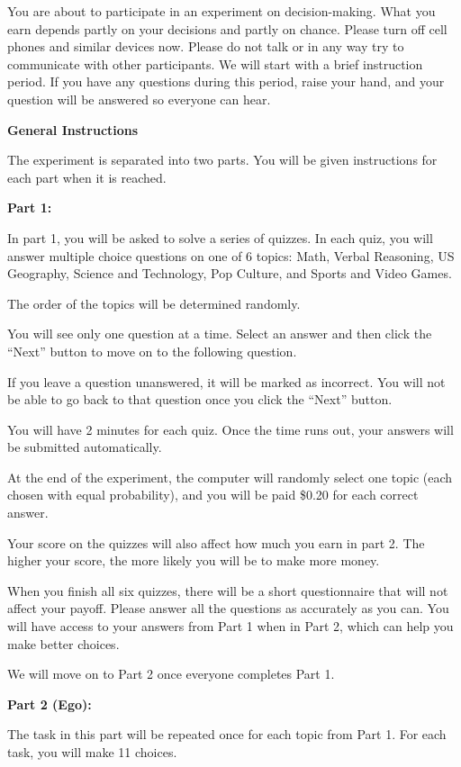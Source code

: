 \documentclass[
  12pt,
]{article}
\begin{document}
You are about to participate in an experiment on decision-making. What
you earn depends partly on your decisions and partly on chance. Please
turn off cell phones and similar devices now. Please do not talk or in
any way try to communicate with other participants. We will start with a
brief instruction period. If you have any questions during this period,
raise your hand, and your question will be answered so everyone can
hear.

\textbf{General Instructions}

The experiment is separated into two parts. You will be given
instructions for each part when it is reached.

\textbf{Part 1:}

In part 1, you will be asked to solve a series of quizzes. In each quiz,
you will answer multiple choice questions on one of 6 topics: Math,
Verbal Reasoning, US Geography, Science and Technology, Pop Culture, and
Sports and Video Games.

The order of the topics will be determined randomly.

You will see only one question at a time. Select an answer and then
click the ``Next'' button to move on to the following question.

If you leave a question unanswered, it will be marked as incorrect. You
will not be able to go back to that question once you click the ``Next''
button.

You will have 2 minutes for each quiz. Once the time runs out, your
answers will be submitted automatically.

At the end of the experiment, the computer will randomly select one
topic (each chosen with equal probability), and you will be paid \$0.20
for each correct answer.

Your score on the quizzes will also affect how much you earn in part 2.
The higher your score, the more likely you will be to make more money.

When you finish all six quizzes, there will be a short questionnaire
that will not affect your payoff. Please answer all the questions as
accurately as you can. You will have access to your answers from Part 1
when in Part 2, which can help you make better choices.

We will move on to Part 2 once everyone completes Part 1.

\textbf{Part 2 (Ego):}

The task in this part will be repeated once for each topic from Part 1.
For each task, you will make 11 choices.
\end{document}
